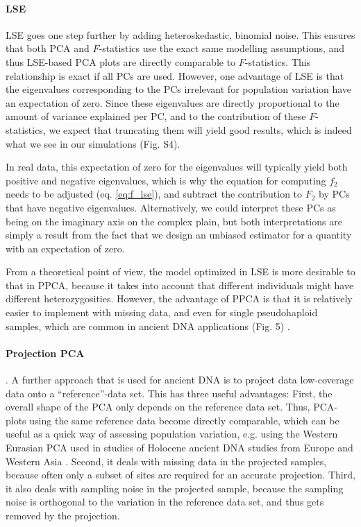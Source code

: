\documentclass[12pt, letterpaper]{article}
\begin{document}
\paragraph{LSE}\label{discussion_LSE}
LSE goes one step further by adding heteroskedastic, binomial noise. This ensures that both PCA and $F$-statistics use the exact same modelling assumptions, and thus LSE-based PCA plots are directly comparable to $F$-statistics. This relationship is exact if all PCs are used. However, one advantage of LSE is that the eigenvalues corresponding to the PCs irrelevant for population variation have an expectation of zero. Since these eigenvalues are directly proportional to the amount of variance explained per PC, and to the contribution of these $F$-statistics, we expect that truncating them will yield good results, which is indeed what we see in our simulations (Fig. S4). 

In real data, this expectation of zero for the eigenvalues will typically yield both positive and negative eigenvalues, which is why the equation for computing $f_2$ needs to be adjusted (eq. \ref{eq:f_lse}), and subtract the contribution to $F_2$ by PCs that have negative eigenvalues. Alternatively, we could interpret these PCs as being on the imaginary axis on the complex plain, but both interpretations are simply a result from the fact that we design an unbiased estimator for a quantity with an expectation of zero. 

From a theoretical point of view, the model optimized in LSE is more desirable to that in PPCA, because it takes into account that different individuals might have different heterozygosities. However, the advantage of PPCA is that it is relatively easier to implement with missing data, and even for single pseudohaploid samples, which are common in ancient DNA applications (Fig. 5) \cite{tipping_probabilistic_1999-1, orlando_ancient_2021}. 


\paragraph{Projection PCA}. A further approach that is used for ancient DNA is to project data low-coverage data onto a ``reference''-data set. This has three useful advantages: First, the overall shape of the PCA only depends on the reference data set. Thus, PCA-plots using the same reference data become directly comparable, which can be useful as a quick way of assessing population variation, e.g. using the Western Eurasian PCA used in studies of Holocene ancient DNA studies from Europe and Western Asia \citep{haak_massive_2015}. Second, it deals with missing data in the projected samples, because often only a subset of sites are required for an accurate projection. Third, it also deals with sampling noise in the projected sample, because the sampling noise is orthogonal to the variation in the reference data set, and thus gets removed by the projection.
\end{document}
